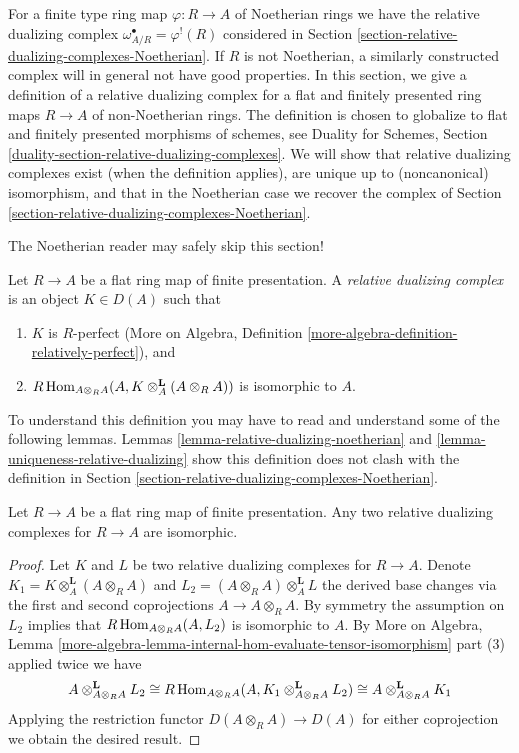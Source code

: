\noindent
For a finite type ring map $\varphi : R \to A$ of Noetherian rings
we have the relative dualizing complex $\omega_{A/R}^\bullet = \varphi^!(R)$
considered in Section \ref{section-relative-dualizing-complexes-Noetherian}.
If $R$ is not Noetherian, a similarly constructed complex will
in general not have good properties. In this section, we give a
definition of a relative dualizing complex for a flat and finitely presented
ring maps $R \to A$ of non-Noetherian rings. The definition is
chosen to globalize to flat and finitely presented morphisms
of schemes, see Duality for Schemes, Section
\ref{duality-section-relative-dualizing-complexes}. We will
show that relative dualizing complexes exist (when the definition
applies), are unique up to (noncanonical) isomorphism,
and that in the Noetherian case we recover the complex of
Section \ref{section-relative-dualizing-complexes-Noetherian}.

\medskip\noindent
The Noetherian reader may safely skip this section!

\begin{definition}
\label{definition-relative-dualizing-complex}
Let $R \to A$ be a flat ring map of finite presentation.
A {\it relative dualizing complex} is an object $K \in D(A)$ such that
\begin{enumerate}
\item $K$ is $R$-perfect (More on Algebra, Definition
\ref{more-algebra-definition-relatively-perfect}), and
\item $R\mathop{\mathrm{Hom}}\nolimits_{A \otimes_R A}(A, K \otimes_A^\mathbf{L} (A \otimes_R A))$
is isomorphic to $A$.
\end{enumerate}
\end{definition}

\noindent
To understand this definition you may have to read and understand some
of the following lemmas. Lemmas \ref{lemma-relative-dualizing-noetherian} and
\ref{lemma-uniqueness-relative-dualizing} show this definition
does not clash with the definition in
Section \ref{section-relative-dualizing-complexes-Noetherian}.

\begin{lemma}
\label{lemma-uniqueness-relative-dualizing}
Let $R \to A$ be a flat ring map of finite presentation.
Any two relative dualizing complexes for $R \to A$ are isomorphic.
\end{lemma}

\begin{proof}
Let $K$ and $L$ be two relative dualizing complexes for $R \to A$.
Denote $K_1 = K \otimes_A^\mathbf{L} (A \otimes_R A)$
and $L_2 = (A \otimes_R A) \otimes_A^\mathbf{L} L$ the
derived base changes via the first and second coprojections
$A \to A \otimes_R A$. By symmetry the assumption on $L_2$
implies that $R\mathop{\mathrm{Hom}}\nolimits_{A \otimes_R A}(A, L_2)$ is isomorphic to $A$.
By More on Algebra, Lemma
\ref{more-algebra-lemma-internal-hom-evaluate-tensor-isomorphism} part (3)
applied twice we have
$$
A \otimes_{A \otimes_R A}^\mathbf{L} L_2 \cong
R\mathop{\mathrm{Hom}}\nolimits_{A \otimes_R A}(A, K_1 \otimes_{A \otimes_R A}^\mathbf{L} L_2) \cong
A \otimes_{A \otimes_R A}^\mathbf{L} K_1
$$
Applying the restriction functor $D(A \otimes_R A) \to D(A)$
for either coprojection we obtain the desired result.
\end{proof}

